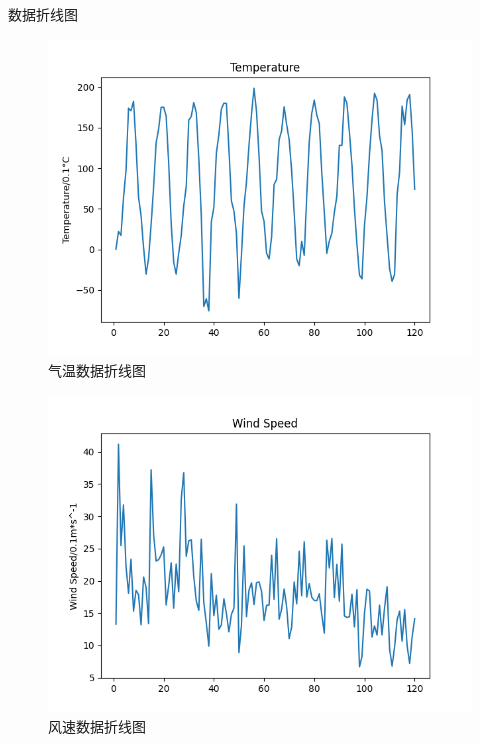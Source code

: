 \documentclass[10pt]{beamer}
\begin{document}
\begin{frame}
\begin{block}{数据折线图}
		\begin{figure}[h!]
			\centering
			\includegraphics[scale=0.21]{../src/prepare_data/tg.png}
			\caption{气温数据折线图}
		\end{figure}

		\begin{figure}[h!]
			\centering
			\includegraphics[scale=0.21]{../src/prepare_data/fg.png}
			\caption{风速数据折线图}
		\end{figure}


\end{block}
\end{frame}
\end{document}
